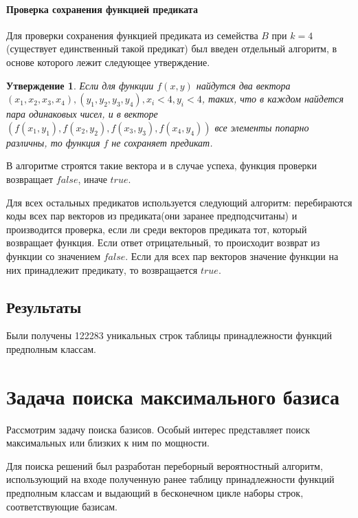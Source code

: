 \documentclass[a4paper,14pt]{extreport}
\newtheorem{utv}{Утверждение}
\begin{document}
\subsubsection{Проверка сохранения функцией предиката}
Для проверки сохранения функцией предиката из семейства $B$ при $k = 4$ (существует единственный такой предикат) был введен отдельный алгоритм, в основе которого лежит следующее утверждение.

\begin{utv}
Если для функции $f(x, y)$ найдутся два вектора $(x_1, x_2, x_3, x_4), (y_1, y_2, y_3, y_4), x_i<4, y_i<4 $, таких, что в каждом найдется пара одинаковых чисел, и в векторе$(f(x_1, y_1),f(x_2, y_2),f(x_3, y_3),f(x_4, y_4))$ все элементы попарно различны, то функция $f$ не сохраняет предикат.  
\end{utv}

В алгоритме строятся такие вектора и в случае успеха, функция проверки возвращает $false$, иначе $true$.

Для всех остальных предикатов используется следующий алгоритм: перебираются коды всех пар векторов из предиката(они заранее предподсчитаны) и производится проверка, если ли среди векторов предиката тот, который возвращает функция. Если ответ отрицательный, то происходит возврат из функции со значением $false$. Если для всех пар векторов значение функции на них принадлежит предикату, то возвращается $true$. 

\section{Результаты}
Были получены 122283 уникальных строк таблицы принадлежности функций предполным классам.


\newpage
\chapter{Задача поиска максимального базиса}
Рассмотрим задачу поиска базисов. Особый интерес представляет поиск максимальных или близких к ним по мощности. 

Для поиска решений был разработан переборный вероятностный алгоритм, использующий на входе полученную ранее таблицу принадлежности функций предполным классам и выдающий в бесконечном цикле наборы строк, соответствующие базисам. 
\end{document}
